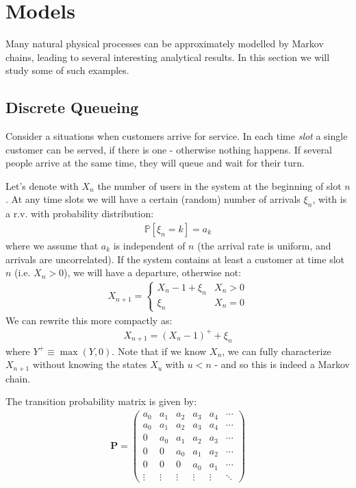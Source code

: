 \documentclass[../template.tex]{subfiles}
\begin{document}
\section{Models}
Many natural physical processes can be approximately modelled by Markov chains, leading to several interesting analytical results. In this section we will study some of such examples. 

\subsection{Discrete Queueing}
Consider a situations when customers arrive for service. In each time \textit{slot} a single customer can be served, if there is one - otherwise nothing happens. If several people arrive at the same time, they will queue and wait for their turn. 

\medskip

Let's denote with $X_n$ the number of users in the system at the beginning of slot $n$. At any time slots we will have a certain (random) number of arrivals $\xi_n$, with is a r.v. with probability distribution:
\begin{align*}
    \mathbb{P}[\xi_n = k] =  a_k
\end{align*}
where we assume that $a_k$ is independent of $n$ (the arrival rate is uniform, and arrivals are uncorrelated). If the system contains at least a customer at time slot $n$ (i.e. $X_n > 0$), we will have a departure, otherwise not:
\begin{align*}
    X_{n+1} = \begin{cases}
        X_n - 1 + \xi_n & X_n > 0\\
        \xi_n & X_n = 0
    \end{cases}
\end{align*}
We can rewrite this more compactly as:
\begin{align*}
    X_{n+1} = (X_n - 1)^+ + \xi_n
\end{align*}
where $Y^+ \equiv \max(Y,0)$. Note that if we know $X_n$, we can fully characterize $X_{n+1}$ without knowing the states $X_u$ with $u < n$ - and so this is indeed a Markov chain. 

\medskip

The transition probability matrix is given by:
\begin{align*}
    \textbf{P} = \left(\begin{array}{cccccc}
    a_0 & a_1  & a_2  & a_3  & a_4  & \cdots \\ 
    a_0 & a_1 & a_2 & a_3 & a_4 & \cdots \\ 
    0 & a_0 & a_1 & a_2 & a_3 & \cdots \\ 
    0 & 0 & a_0 & a_1 & a_2 & \cdots \\ 
    0 & 0 & 0 & a_0 & a_1 & \cdots \\ 
    \vdots & \vdots & \vdots & \vdots & \vdots & \ddots
    \end{array}\right)
\end{align*}
\end{document}

